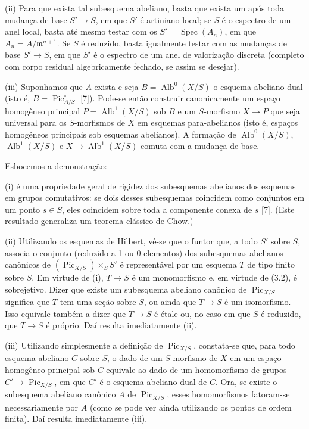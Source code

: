 \noindent(ii) Para que exista tal subesquema abeliano, basta que exista um
após toda mudança de base $S'\longrightarrow S$, em que $S'$ é artiniano
local; se $S$ é o espectro de um anel local, basta até mesmo testar com os
$S'=\operatorname{Spec}(A_n)$, em que $A_n=A/\mathfrak m^{n+1}$. Se $S$ é
reduzido, basta igualmente testar com as mudanças de base
$S'\longrightarrow S$, em que $S'$ é o espectro de um anel de valorização
discreta (completo com corpo residual algebricamente fechado, se assim se
desejar).

\noindent(iii) Suponhamos que $A$ exista e seja
$B=\operatorname{Alb}^0(X/S)$ o esquema abeliano dual (isto é,
$B=\operatorname{Pic}_{A/S}^\circ$ [7]). Pode-se então construir
canonicamente um espaço homogêneo principal
$P=\operatorname{Alb}^1(X/S)$ sob $B$ e um $S$-morfismo
$X\longrightarrow P$ que seja universal para os $S$-morfismos de $X$ em
esquemas para-abelianos (isto é, espaços homogêneos principais sob esquemas
abelianos). A formação de $\operatorname{Alb}^0(X/S)$,
$\operatorname{Alb}^1(X/S)$ e
$X\longrightarrow\operatorname{Alb}^1(X/S)$ comuta com a mudança de base.

Esbocemos a demonstração:

(i) é uma propriedade geral de rigidez dos subesquemas abelianos dos esquemas
em grupos comutativos: se dois desses subesquemas coincidem como conjuntos em
um ponto $s\in S$, eles coincidem sobre toda a componente
conexa de $s$ [7]. (Este resultado generaliza um teorema clássico de Chow.)

(ii) Utilizando os esquemas de Hilbert, vê-se que o funtor que, a todo $S'$
sobre $S$, associa o conjunto (reduzido a 1 ou 0 elementos) dos subesquemas
abelianos canônicos de $(\operatorname{Pic}_{X/S})\times_S S'$ é
representável por um esquema $T$ de tipo finito sobre $S$. Em virtude de (i),
$T\longrightarrow S$ é um monomorfismo e, em virtude de (3.2), é
sobrejetivo. Dizer que existe um subesquema abeliano canônico de
$\operatorname{Pic}_{X/S}$ significa que $T$ tem uma seção sobre $S$, ou ainda
que $T\longrightarrow S$ é um isomorfismo. Isso equivale também a dizer que
$T\longrightarrow S$ é étale ou, no caso em que $S$ é reduzido, que
$T\longrightarrow S$ é próprio. Daí resulta imediatamente (ii).

(iii) Utilizando simplesmente a definição de $\operatorname{Pic}_{X/S}$,
constata-se que, para todo esquema abeliano $C$ sobre $S$, o dado de um
$S$-morfismo de $X$ em um espaço homogêneo principal sob $C$ equivale ao dado
de um homomorfismo de grupos
$C'\longrightarrow\operatorname{Pic}_{X/S}$, em que $C'$ é o esquema abeliano
dual de $C$. Ora, se existe o subesquema abeliano canônico $A$ de
$\operatorname{Pic}_{X/S}$, esses homomorfismos fatoram-se necessariamente por
$A$ (como se pode ver ainda utilizando os pontos de ordem finita). Daí resulta
imediatamente (iii).

